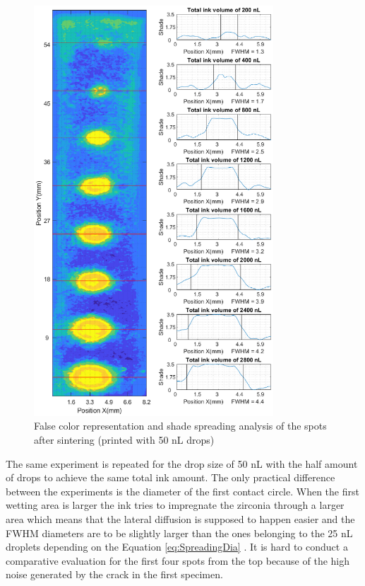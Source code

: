 \begin{figure}[H]
	\centering
	\includegraphics[width=0.8\textwidth]{grafiken/drops50.eps}
	\caption{False color representation and shade spreading analysis of the spots after sintering (printed with 50 nL drops)}
	\label{fig:drops50}
\end{figure} 

\bigskip 
 The same experiment is repeated for the drop size of 50 nL with the half amount of drops to achieve the same total ink amount. The only practical difference between the experiments is the diameter of the first contact circle. When the first wetting area is larger the ink tries to impregnate the zirconia through a larger area which means that the lateral diffusion is supposed to happen easier and the FWHM diameters are to be slightly larger than the ones belonging to the 25 nL droplets depending on the Equation \ref{eq:SpreadingDia} . It is hard to conduct a comparative evaluation for the first four spots from the top because of the high noise generated by the crack in the first specimen. 
 
